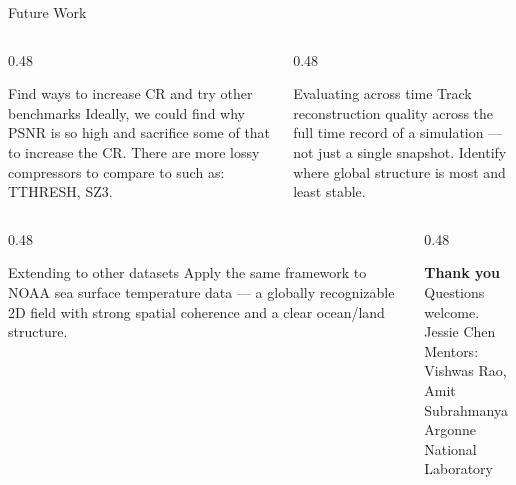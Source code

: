 \documentclass[aspectratio=169, 11pt]{beamer}
\begin{document}
\begin{frame}{Future Work}
\begin{columns}[T]

\begin{column}{0.48\textwidth}
\begingroup
{}
\begin{block}{Find ways to increase CR and try other benchmarks}
  \small
  Ideally, we could find why PSNR is so high and sacrifice some of that to increase the CR. There are more lossy compressors to compare to such as: TTHRESH, SZ3.
\end{block}
\endgroup
\end{column}

  \begin{column}{0.48\textwidth}
    \begingroup
    \begin{block}{Evaluating across time}
      \small
      Track reconstruction quality across the full time record of a
      simulation — not just a single snapshot. Identify where global
      structure is most and least stable.
    \end{block}
    \endgroup
  \end{column}

\end{columns}

\vspace{0.5em}
\begin{columns}[T]

  \begin{column}{0.48\textwidth}
    \begingroup
    \begin{block}{Extending to other datasets}
      \small
      Apply the same framework to NOAA sea surface temperature data —
      a globally recognizable 2D field with strong spatial coherence
      and a clear ocean/land structure.
    \end{block}
    \endgroup
  \end{column}

  \begin{column}{0.48\textwidth}
    \vspace{0.4em}
    \begin{center}
      {\Large\color{cteal}\textbf{Thank you}}\\[0.3em]
      {\small\color{cmuted}
        Questions welcome.\\[0.4em]
        Jessie Chen \\[0.2em]
        Mentors: Vishwas Rao, Amit Subrahmanya\\
        {\footnotesize Argonne National Laboratory}
      }
    \end{center}
  \end{column}

\end{columns}
\end{frame}

\end{document}
